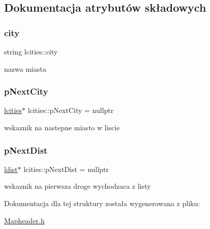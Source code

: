 \subsection{Dokumentacja atrybutów składowych}
\mbox{\label{structlcities_ab7fec18ea0ddc46480007d8eaf327a0f}} 
\subsubsection{\texorpdfstring{city}{city}}
{\footnotesize\ttfamily string lcities\+::city}

nazwa miasta \mbox{\label{structlcities_a04f15fa0285017666a64233b9aad441d}} 
\subsubsection{\texorpdfstring{p\+Next\+City}{pNextCity}}
{\footnotesize\ttfamily \mbox{\hyperlink{structlcities}{lcities}}$\ast$ lcities\+::p\+Next\+City = nullptr}

wskaznik na nastepne miasto w liscie \mbox{\label{structlcities_a2415f938e641bf7b0075f98132802c9c}} 
\subsubsection{\texorpdfstring{p\+Next\+Dist}{pNextDist}}
{\footnotesize\ttfamily \mbox{\hyperlink{structlcities_1_1ldist}{ldist}}$\ast$ lcities\+::p\+Next\+Dist = nullptr}

wskaznik na pierwsza droge wychodzaca z listy 

Dokumentacja dla tej struktury została wygenerowana z pliku\+:\begin{DoxyCompactItemize}
\item 
\mbox{\hyperlink{_mapheader_8h}{Mapheader.\+h}}\end{DoxyCompactItemize}
